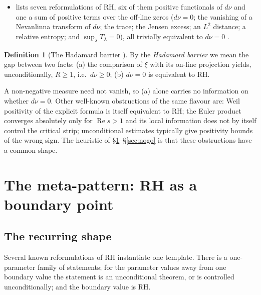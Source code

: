 \documentclass[11pt]{amsart}
\theoremstyle{definition}
\newtheorem{definition}[theorem]{Definition}
\theoremstyle{remark}
\newcommand{\RH}{\mathrm{RH}}
\newcommand{\dnu}{d\nu}
\newcommand{\Tl}{T_\lambda}
\DeclareMathOperator{\Real}{Re}
\begin{document}
\begin{itemize}
\begin{equation}\label{eq:p39}
\RH\iff \Tl=0\ \text{for one (equivalently, every) }\lambda>0,
\end{equation}
and \cite{P24} states that this is a trivial restatement of $\dnu=0$.
\item \cite[Thm.~4.1]{P24} lists seven reformulations of RH, six of them positive functionals of $\dnu$ and one a sum of positive terms over the off-line zeros ($\dnu=0$;
the vanishing of a Nevanlinna transform of $\dnu$; the trace; the Jensen excess; an $L^2$
distance; a relative entropy; and $\sup_\lambda\Tl=0$), all trivially equivalent to $\dnu=0$
\cite[Rem.~7.2]{P24}.
\end{itemize}

\begin{definition}[The Hadamard barrier {\cite[Def.~7.1]{P24}}]\label{def:hadamard}
By the \emph{Hadamard barrier} we mean the gap between two facts: (a) the comparison of $\xi$
with its on-line projection yields, unconditionally, $R\ge1$, i.e.\ $\dnu\ge0$; (b) $\dnu=0$ is
equivalent to RH.
\end{definition}

A non-negative measure need not vanish, so (a) alone carries no information on whether
$\dnu=0$. Other well-known obstructions of the same flavour are: Weil positivity of the explicit
formula is itself equivalent to RH; the Euler product converges absolutely only for $\Real s>1$
and its local information does not by itself control the critical strip; unconditional
estimates typically give positivity bounds of the wrong sign. The heuristic of
\S\ref{sec:metapattern}--\S\ref{sec:nogo} is that these obstructions have a common shape.

\section{The meta-pattern: RH as a boundary point}\label{sec:metapattern}

\subsection{The recurring shape}
Several known reformulations of RH instantiate one template. There is a one-parameter family of
statements; for the parameter values away from one boundary value the statement is an
unconditional theorem, or is controlled unconditionally; and the boundary value is RH.
\end{document}
